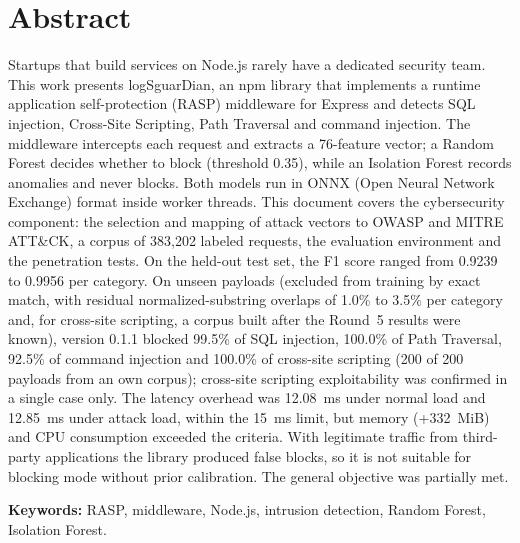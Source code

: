 \ifdefined\modoensamble
\else
	
	\chapter*{Abstract}
\fi

Startups that build services on Node.js rarely have a dedicated security team. This work presents logSguarDian, an npm library that implements a runtime application self-protection (RASP) middleware for Express and detects SQL injection, Cross-Site Scripting, Path Traversal and command injection. The middleware intercepts each request and extracts a 76-feature vector; a Random Forest decides whether to block (threshold 0.35), while an Isolation Forest records anomalies and never blocks. Both models run in ONNX (Open Neural Network Exchange) format inside worker threads. This document covers the cybersecurity component: the selection and mapping of attack vectors to OWASP and MITRE ATT\&CK, a corpus of 383,202 labeled requests, the evaluation environment and the penetration tests. On the held-out test set, the F1 score ranged from 0.9239 to 0.9956 per category. On unseen payloads (excluded from training by exact match, with residual normalized-substring overlaps of 1.0\% to 3.5\% per category and, for cross-site scripting, a corpus built after the Round~5 results were known), version 0.1.1 blocked 99.5\% of SQL injection, 100.0\% of Path Traversal, 92.5\% of command injection and 100.0\% of cross-site scripting (200 of 200 payloads from an own corpus); cross-site scripting exploitability was confirmed in a single case only. The latency overhead was 12.08~ms under normal load and 12.85~ms under attack load, within the 15~ms limit, but memory (+332~MiB) and CPU consumption exceeded the criteria. With legitimate traffic from third-party applications the library produced false blocks, so it is not suitable for blocking mode without prior calibration. The general objective was partially met.

\medskip
\noindent\textbf{Keywords:} RASP, middleware, Node.js, intrusion detection, Random Forest, Isolation Forest.

\ifdefined\modoensamble
\else
	
\fi
